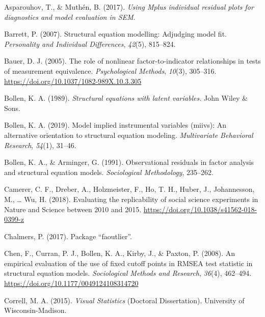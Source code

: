 \documentclass[
  english,
  doc]{apa6}
\newlength{\cslhangindent}
\newenvironment{cslreferences}%
  {\setlength{\parindent}{0pt}%
  \everypar{\setlength{\hangindent}{\cslhangindent}}\ignorespaces}%
  {\par}
\begin{document}
\hypertarget{refs}{}
\begin{cslreferences}
\leavevmode\hypertarget{ref-Asparouhov2017}{}%
Asparouhov, T., \& Muthén, B. (2017). \emph{Using Mplus individual residual plots for diagnostics and model evaluation in SEM}.

\leavevmode\hypertarget{ref-barrett2007structural}{}%
Barrett, P. (2007). Structural equation modelling: Adjudging model fit. \emph{Personality and Individual Differences}, \emph{42}(5), 815--824.

\leavevmode\hypertarget{ref-Bauer2005}{}%
Bauer, D. J. (2005). The role of nonlinear factor-to-indicator relationships in tests of measurement equivalence. \emph{Psychological Methods}, \emph{10}(3), 305--316. \url{https://doi.org/10.1037/1082-989X.10.3.305}

\leavevmode\hypertarget{ref-bollen_structural_1989}{}%
Bollen, K. A. (1989). \emph{Structural equations with latent variables.} John Wiley \& Sons.

\leavevmode\hypertarget{ref-bollen2019model}{}%
Bollen, K. A. (2019). Model implied instrumental variables (miivs): An alternative orientation to structural equation modeling. \emph{Multivariate Behavioral Research}, \emph{54}(1), 31--46.

\leavevmode\hypertarget{ref-bollen1991observational}{}%
Bollen, K. A., \& Arminger, G. (1991). Observational residuals in factor analysis and structural equation models. \emph{Sociological Methodology}, 235--262.

\leavevmode\hypertarget{ref-Camerer2018}{}%
Camerer, C. F., Dreber, A., Holzmeister, F., Ho, T. H., Huber, J., Johannesson, M., \ldots{} Wu, H. (2018). Evaluating the replicability of social science experiments in Nature and Science between 2010 and 2015. \url{https://doi.org/10.1038/s41562-018-0399-z}

\leavevmode\hypertarget{ref-chalmers2017package}{}%
Chalmers, P. (2017). Package ``faoutlier''.

\leavevmode\hypertarget{ref-Chen2008}{}%
Chen, F., Curran, P. J., Bollen, K. A., Kirby, J., \& Paxton, P. (2008). An empirical evaluation of the use of fixed cutoff points in RMSEA test statistic in structural equation models. \emph{Sociological Methods and Research}, \emph{36}(4), 462--494. \url{https://doi.org/10.1177/0049124108314720}

\leavevmode\hypertarget{ref-Correll2015}{}%
Correll, M. A. (2015). \emph{Visual Statistics} (Doctoral Dissertation). University of Wisconsin-Madison.


\end{cslreferences}
\end{document}

